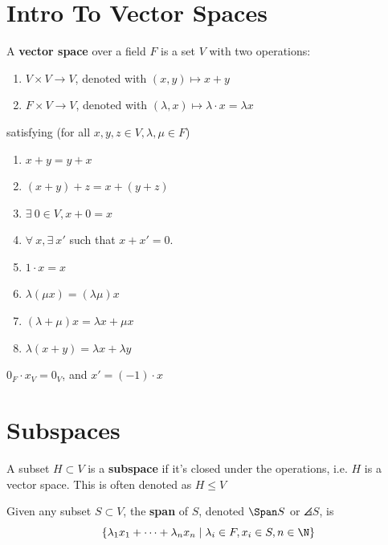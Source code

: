 
\section{Intro To Vector Spaces}

\begin{defn}
    A \textbf{vector space} over a field $F$ is a set $V$ with two operations:
    \begin{enumerate}
        \item[$+:$] $V\times V \to V$, denoted with $(x,y) \mapsto x+y$
        \item[$\cdot:$]$F \times V \to V$, denoted with $(\lambda ,x)\mapsto \lambda \cdot x=\lambda x$
    \end{enumerate}
    satisfying (for all $x,y,z\in V,\lambda,\mu \in F$)
    \begin{enumerate}
        \item $x+y=y+x$
        \item $(x+y)+z=x+(y+z)$
        \item $\exists \: 0 \in V,x+0=x$
        \item $\forall \: x,\exists\: x'$ such that $x+x'=0$.
        \item $1 \cdot x=x$
        \item $\lambda (\mu x)=(\lambda \mu)x$
        \item $(\lambda + \mu)x = \lambda x + \mu x$
        \item $\lambda(x+y)=\lambda x+\lambda y$
    \end{enumerate}
\end{defn}

\begin{prop}
    $0_F \cdot x_V = 0_V$, and $x'=(-1) \cdot x$
\end{prop}

\section{Subspaces}
\begin{defn}
    A subset $H \subset V$ is a \textbf{subspace} if it's closed under the operations, i.e. $H$ is a vector space. This is often denoted as $H \leq V$
\end{defn}

\begin{defn}
    Given any subset $S\subset V$, the \textbf{span} of $S$, denoted $\Span S$ or $\angles{S}$, is
    $$\{\lambda_1x_1 +\cdots +\lambda _nx_n\mid \lambda_i \in F,x_i \in S,n \in \N\}$$
\end{defn}

